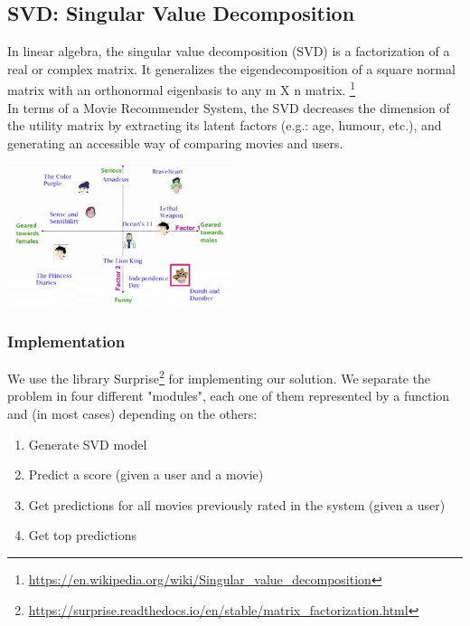\subsection{SVD: Singular Value Decomposition}
In linear algebra, the singular value decomposition (SVD) is a factorization of
a real or complex matrix. It generalizes the eigendecomposition of a square normal
matrix with an orthonormal eigenbasis to any {m X n} matrix.
\footnote{\href{https://en.wikipedia.org/wiki/Singular\_value\_decomposition}{https://en.wikipedia.org/wiki/Singular\_value\_decomposition}}\\
In terms of a Movie Recommender System, the SVD decreases the dimension of the utility matrix
by extracting its latent factors (e.g.: age, humour, etc.), and generating an accessible way of
comparing movies and users.\\

\begin{center}
    \captionsetup{type=figure}
    \includegraphics[width=250px]{images/svd-00.png}
\end{center}
\subsubsection*{Implementation}
We use the library Surprise\footnote{\href{https://surprise.readthedocs.io/en/stable/matrix\_factorization.html}{https://surprise.readthedocs.io/en/stable/matrix\_factorization.html}}
for implementing our solution. We separate the problem in four different "modules", each one of them represented by a function
and (in most cases) depending on the others:
\begin{enumerate}
    \item Generate SVD model
    \item Predict a score (given a user and a movie)
    \item Get predictions for all movies previously rated in the system (given a user)
    \item Get top predictions
\end{enumerate}
